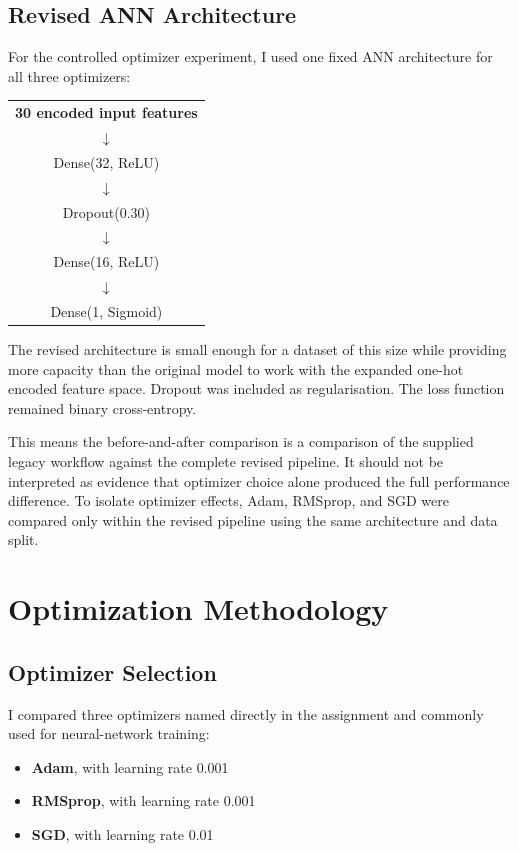 \documentclass[11pt]{article}
\begin{document}
\subsection{Revised ANN Architecture}

For the controlled optimizer experiment, I used one fixed ANN architecture for all three optimizers:

\begin{center}
\begin{tabular}{c}
\textbf{30 encoded input features}\\
$\downarrow$\\
Dense(32, ReLU)\\
$\downarrow$\\
Dropout(0.30)\\
$\downarrow$\\
Dense(16, ReLU)\\
$\downarrow$\\
Dense(1, Sigmoid)
\end{tabular}
\end{center}

The revised architecture is small enough for a dataset of this size while providing more capacity than the original model to work with the expanded one-hot encoded feature space. Dropout was included as regularisation. The loss function remained binary cross-entropy.

This means the before-and-after comparison is a comparison of the supplied legacy workflow against the complete revised pipeline. It should not be interpreted as evidence that optimizer choice alone produced the full performance difference. To isolate optimizer effects, Adam, RMSprop, and SGD were compared only within the revised pipeline using the same architecture and data split.

\section{Optimization Methodology}

\subsection{Optimizer Selection}

I compared three optimizers named directly in the assignment and commonly used for neural-network training:

\begin{itemize}[leftmargin=*]
    \item \textbf{Adam}, with learning rate 0.001
    \item \textbf{RMSprop}, with learning rate 0.001
    \item \textbf{SGD}, with learning rate 0.01
\end{itemize}
\end{document}
